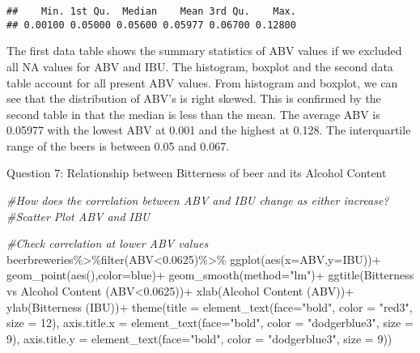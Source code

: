\documentclass[
]{article}
\newenvironment{Shaded}{\begin{snugshade}}{\end{snugshade}}
\newcommand{\AttributeTok}[1]{\textcolor[rgb]{0.77,0.63,0.00}{#1}}
\newcommand{\CommentTok}[1]{\textcolor[rgb]{0.56,0.35,0.01}{\textit{#1}}}
\newcommand{\DecValTok}[1]{\textcolor[rgb]{0.00,0.00,0.81}{#1}}
\newcommand{\FloatTok}[1]{\textcolor[rgb]{0.00,0.00,0.81}{#1}}
\newcommand{\FunctionTok}[1]{\textcolor[rgb]{0.00,0.00,0.00}{#1}}
\newcommand{\NormalTok}[1]{#1}
\newcommand{\SpecialCharTok}[1]{\textcolor[rgb]{0.00,0.00,0.00}{#1}}
\newcommand{\StringTok}[1]{\textcolor[rgb]{0.31,0.60,0.02}{#1}}
\begin{document}
\begin{verbatim}
##    Min. 1st Qu.  Median    Mean 3rd Qu.    Max. 
## 0.00100 0.05000 0.05600 0.05977 0.06700 0.12800
\end{verbatim}

The first data table shows the summary statistics of ABV values if we
excluded all NA values for ABV and IBU. The histogram, boxplot and the
second data table account for all present ABV values. From histogram and
boxplot, we can see that the distribution of ABV's is right skewed. This
is confirmed by the second table in that the median is less than the
mean. The average ABV is 0.05977 with the lowest ABV at 0.001 and the
highest at 0.128. The interquartile range of the beers is between 0.05
and 0.067.

Question 7: Relationship between Bitterness of beer and its Alcohol
Content

\begin{Shaded}
\begin{Highlighting}[]
\CommentTok{\#How does the correlation between ABV and IBU change as either increase?}
\CommentTok{\#Scatter Plot ABV and IBU}

\CommentTok{\#Check correlation at lower ABV values}
\NormalTok{beerbreweries}\SpecialCharTok{\%\textgreater{}\%}\FunctionTok{filter}\NormalTok{(ABV}\SpecialCharTok{\textless{}}\FloatTok{0.0625}\NormalTok{)}\SpecialCharTok{\%\textgreater{}\%}
  \FunctionTok{ggplot}\NormalTok{(}\FunctionTok{aes}\NormalTok{(}\AttributeTok{x=}\NormalTok{ABV,}\AttributeTok{y=}\NormalTok{IBU))}\SpecialCharTok{+}
  \FunctionTok{geom\_point}\NormalTok{(}\FunctionTok{aes}\NormalTok{(),}\AttributeTok{color=}\StringTok{\textquotesingle{}blue\textquotesingle{}}\NormalTok{)}\SpecialCharTok{+}
  \FunctionTok{geom\_smooth}\NormalTok{(}\AttributeTok{method=}\StringTok{"lm"}\NormalTok{)}\SpecialCharTok{+}
  \FunctionTok{ggtitle}\NormalTok{(}\StringTok{\textquotesingle{}Bitterness vs Alcohol Content (ABV\textless{}0.0625)\textquotesingle{}}\NormalTok{)}\SpecialCharTok{+}
  \FunctionTok{xlab}\NormalTok{(}\StringTok{\textquotesingle{}Alcohol Content (ABV)\textquotesingle{}}\NormalTok{)}\SpecialCharTok{+}
  \FunctionTok{ylab}\NormalTok{(}\StringTok{\textquotesingle{}Bitterness (IBU)\textquotesingle{}}\NormalTok{)}\SpecialCharTok{+}
  \FunctionTok{theme}\NormalTok{(}\AttributeTok{title =} \FunctionTok{element\_text}\NormalTok{(}\AttributeTok{face=}\StringTok{"bold"}\NormalTok{, }\AttributeTok{color =} \StringTok{"red3"}\NormalTok{, }\AttributeTok{size =} \DecValTok{12}\NormalTok{),}
        \AttributeTok{axis.title.x =} \FunctionTok{element\_text}\NormalTok{(}\AttributeTok{face=}\StringTok{"bold"}\NormalTok{, }\AttributeTok{color =} \StringTok{"dodgerblue3"}\NormalTok{, }\AttributeTok{size =} \DecValTok{9}\NormalTok{),}
        \AttributeTok{axis.title.y =} \FunctionTok{element\_text}\NormalTok{(}\AttributeTok{face=}\StringTok{"bold"}\NormalTok{, }\AttributeTok{color =} \StringTok{"dodgerblue3"}\NormalTok{, }\AttributeTok{size =} \DecValTok{9}\NormalTok{))}
\end{Highlighting}
\end{Shaded}
\end{document}

